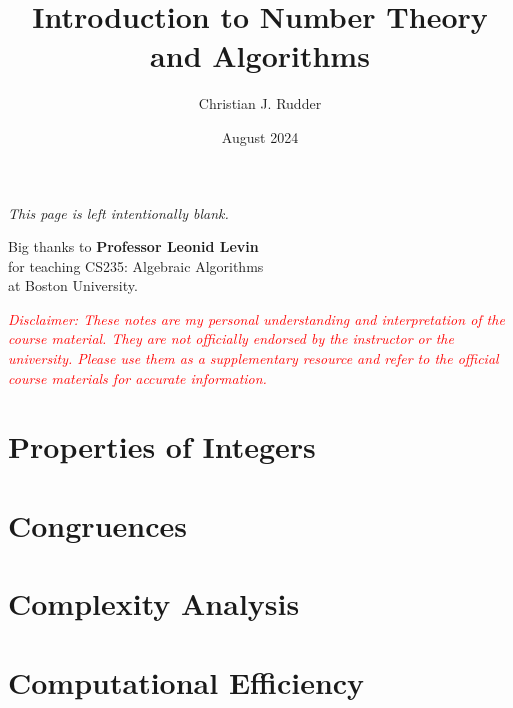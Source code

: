 \documentclass{memoir}
\title{Introduction to Number Theory and Algorithms}
\author{Christian J. Rudder}
\date{August 2024}
\begin{document}
\maketitle
\setcounter{tocdepth}{2}

\tableofcontents

\newpage
\thispagestyle{empty}
\mbox{}
\vfill
\begin{center}
    \textit{This page is left intentionally blank.}
\end{center}
\vfill
\newpage
\thispagestyle{empty}
\mbox{}
\vfill
\begin{center}
    \Large{Big thanks to \textbf{Professor Leonid Levin}}\\
    \normalsize 
    for teaching CS235: Algebraic Algorithms\\
    at Boston University.\\
\end{center}

\vfill
    \begin{center}
        \textcolor{red}{\textit{Disclaimer: These notes are my personal understanding and interpretation of the course material. 
        They are not officially endorsed by the instructor or the university. Please use them as a supplementary resource and refer 
        to the official course materials for accurate information.}}
    \end{center}
\newpage




\chapter{Properties of Integers}





\chapter{Congruences}








\chapter{Complexity Analysis}





\chapter{Computational Efficiency}

\end{document}

